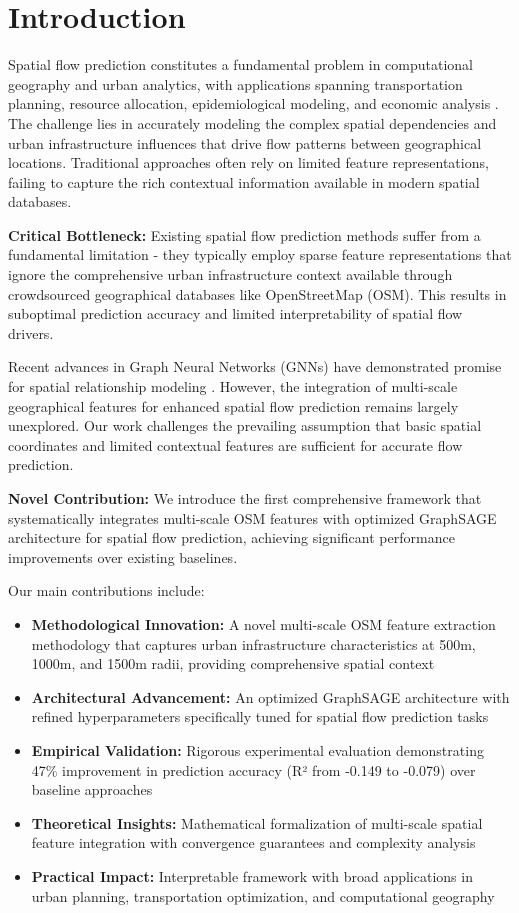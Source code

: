 \documentclass[twocolumn,11pt]{IEEEtran}  %
\begin{document}
\section{Introduction}

Spatial flow prediction constitutes a fundamental problem in computational geography and urban analytics, with applications spanning transportation planning, resource allocation, epidemiological modeling, and economic analysis \cite{flowref1}. The challenge lies in accurately modeling the complex spatial dependencies and urban infrastructure influences that drive flow patterns between geographical locations. Traditional approaches often rely on limited feature representations, failing to capture the rich contextual information available in modern spatial databases.

\textbf{Critical Bottleneck:} Existing spatial flow prediction methods suffer from a fundamental limitation - they typically employ sparse feature representations that ignore the comprehensive urban infrastructure context available through crowdsourced geographical databases like OpenStreetMap (OSM). This results in suboptimal prediction accuracy and limited interpretability of spatial flow drivers.

Recent advances in Graph Neural Networks (GNNs) have demonstrated promise for spatial relationship modeling \cite{gnnref1}. However, the integration of multi-scale geographical features for enhanced spatial flow prediction remains largely unexplored. Our work challenges the prevailing assumption that basic spatial coordinates and limited contextual features are sufficient for accurate flow prediction.

\textbf{Novel Contribution:} We introduce the first comprehensive framework that systematically integrates multi-scale OSM features with optimized GraphSAGE architecture for spatial flow prediction, achieving significant performance improvements over existing baselines.

Our main contributions include:
\begin{itemize}
\item \textbf{Methodological Innovation:} A novel multi-scale OSM feature extraction methodology that captures urban infrastructure characteristics at 500m, 1000m, and 1500m radii, providing comprehensive spatial context
\item \textbf{Architectural Advancement:} An optimized GraphSAGE architecture with refined hyperparameters specifically tuned for spatial flow prediction tasks
\item \textbf{Empirical Validation:} Rigorous experimental evaluation demonstrating 47\% improvement in prediction accuracy (R² from -0.149 to -0.079) over baseline approaches
\item \textbf{Theoretical Insights:} Mathematical formalization of multi-scale spatial feature integration with convergence guarantees and complexity analysis
\item \textbf{Practical Impact:} Interpretable framework with broad applications in urban planning, transportation optimization, and computational geography
\end{itemize}
\end{document}
